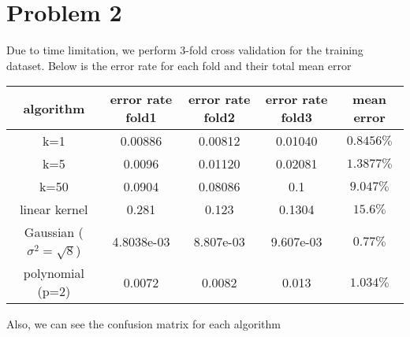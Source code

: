 \documentclass{article}
\begin{document}
 

\section{Problem 2}
Due to time limitation, we perform 3-fold cross validation for the training dataset. Below is the error rate for each fold and their total mean error
\begin{table}[H]
	\centering
	\begin{tabular}{c|c|c|c|c}
		\hline
		algorithm&error rate fold1 &error rate fold2 &error rate fold3&mean error\\
		\hline
		\hline
		k=1&0.00886 &0.00812& 0.01040&$ 0.8456\%$\\
		\hline
		k=5& 0.0096& 0.01120& 0.02081&$ 1.3877\%$\\
		\hline
		k=50&0.0904& 0.08086& 0.1& $9.047\%$\\
		\hline
		\hline
		linear kernel& 0.281& 0.123&0.1304&$15.6\%$\\
		\hline
		Gaussian ($\sigma^2=\sqrt{8}$) &4.8038e-03& 8.807e-03& 9.607e-03& $0.77\%$\\
		\hline
		polynomial (p=2)&0.0072& 0.0082& 0.013& $1.034\%$\\
			\hline
		\hline
	\end{tabular}
\end{table}
Also, we can see the confusion matrix for each algorithm 
\end{document}
